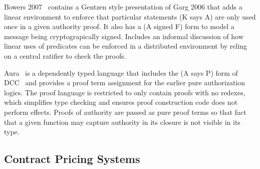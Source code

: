 Bowers 2007~\cite{Bowers2007:Consumable} contains a Gentzen style presentation of Garg 2006 that adds a linear environment to enforce that particular statements (K says A) are only used once in a given authority proof. It also has a (A signed F) form to model a message being cryptograpically signed. Includes an informal discussion of how linear uses of predicates can be enforced in a distributed environment by reling on a central ratifier to check the proofs.

Aura~\cite{Jia2008:Aura} is a dependently typed language that includes the (A says P) form of DCC~\cite{Abadi1999:DCC} and provides a proof term assignment for the earlier pure authorization logics. The proof language is restricted to only contain proofs with no redexes, which simplifies type checking and ensures proof construction code does not perform effects. Proofs of authority are passed as pure proof terms so that fact that a given function may capture authority in its closure is not visible in its type.


\subsection{Contract Pricing Systems}
